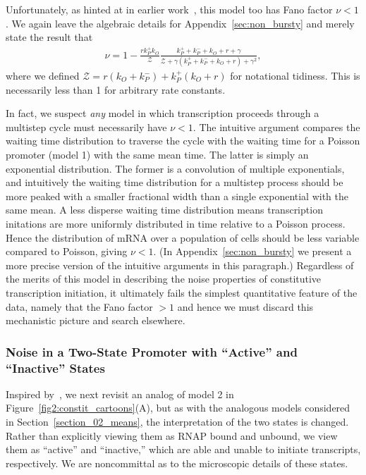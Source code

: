 Unfortunately, as hinted at in earlier work~\cite{Mitarai2015}, this model too
has Fano factor $\nu<1$. We again leave the algebraic details for
Appendix~\ref{sec:non_bursty} and merely state the result that
\begin{align}
\nu = 1 - \frac{r k_P^+ k_O}{\mathcal{Z}}
\frac{k_P^+ + k_P^- + k_O + r + \gamma}
    {\mathcal{Z} + \gamma(k_P^+ + k_P^- + k_O + r) + \gamma^2},
\label{eq:model3_fano}
\end{align}
where we defined $\mathcal{Z} = r(k_O + k_P^-) + k_P^+(k_O + r)$ for notational
tidiness. This is necessarily less than 1 for arbitrary rate constants.

In fact, we suspect \textit{any} model in which transcription proceeds through a
multistep cycle must necessarily have $\nu<1$. The intuitive argument compares
the waiting time distribution to traverse the cycle with the waiting time for a
Poisson promoter (model 1) with the same mean time. The latter is simply an
exponential distribution. The former is a convolution of multiple exponentials,
and intuitively the waiting time distribution for a multistep process
should be more peaked with a smaller fractional width than a single
exponential with the same mean.
A less disperse waiting time distribution means transcription initations are
more uniformly distributed in time relative to a Poisson process. Hence the
distribution of mRNA over a population of cells should be less variable compared
to Poisson, giving $\nu<1$.
(In Appendix~\ref{sec:non_bursty} we present a more precise version
of the intuitive arguments in this paragraph.)
Regardless of the merits of this model in describing the noise properties of
constitutive transcription initiation, it ultimately fails the simplest
quantitative feature of the data, namely that the Fano factor $> 1$ and hence
we must discard this mechanistic picture and search elsewhere.

\subsubsection{Noise in a Two-State Promoter with ``Active'' and ``Inactive''
States}

Inspired by~\cite{Razo-Mejia2020}, we next revisit an analog of model 2 in
Figure~\ref{fig2:constit_cartoons}(A), but as with
the analogous models considered in Section~\ref{section_02_means},
the interpretation of the two
states is changed. Rather than explicitly viewing them as RNAP bound and
unbound, we view them as ``active'' and ``inactive,'' which are able and unable
to initiate transcripts, respectively. We are noncommittal as to the microscopic
details of these states.

